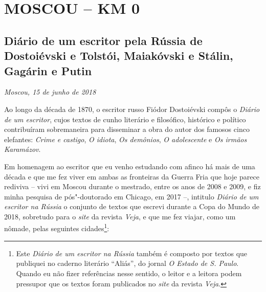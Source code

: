 \movetooddpage
{}
\part*{MOSCOU -- KM 0}


\movetooddpage
\chapter*{Diário de um escritor pela Rússia de Dostoiévski e Tolstói, Maiakóvski e Stálin, Gagárin e Putin}

\begin{flushright}
\emph{Moscou, 15 de junho de 2018}
\end{flushright}

Ao longo da década de 1870, o escritor russo Fiódor Dostoiévski compôs o
\emph{Diário de um escritor}, cujos textos de cunho literário e
filosófico, histórico e político contribuíram sobremaneira para
disseminar a obra do autor dos famosos cinco elefantes: \emph{Crime e
castigo}, \emph{O idiota}, \emph{Os demônios}, \emph{O adolescente} e
\emph{Os irmãos Karamázov}.

Em homenagem ao escritor que eu venho estudando com afinco há mais de
uma década e que me fez viver em ambas as fronteiras da Guerra Fria que
hoje parece rediviva -- vivi em Moscou durante o mestrado, entre os anos
de 2008 e 2009, e fiz minha pesquisa de pós"-doutorado em Chicago, em
2017 --, intitulo \emph{Diário de um escritor na Rússia} o conjunto de
textos que escrevi durante a Copa do Mundo de 2018, sobretudo para o
\emph{site} da revista \emph{Veja}, e que me fez viajar, como um nômade,
pelas seguintes cidades\footnote{Este \emph{Diário de um escritor na
  Rússia} também é composto por textos que publiquei no caderno
  literário ``Aliás'', do jornal \emph{O Estado de S. Paulo}. Quando eu
  não fizer referências nesse sentido, o leitor e a leitora podem
  pressupor que os textos foram publicados no \emph{site} da revista
  \emph{Veja}.}:

